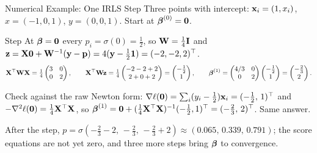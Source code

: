 \documentclass[11pt,aspectratio=169]{beamer}
\begin{document}
\begin{frame}{Numerical Example: One IRLS Step}\footnotesize
Three points with intercept: $\mathbf{x}_i=(1,x_i)$, $x=(-1,0,1)$, $y=(0,0,1)$. Start at $\boldsymbol{\beta}^{(0)}=\mathbf{0}$.
\begin{derivation}{Step}
At $\boldsymbol{\beta}=\mathbf{0}$ every $p_i=\sigma(0)=\tfrac12$, so $\mathbf{W}=\tfrac14\mathbf{I}$ and
$\mathbf{z}=\mathbf{X}\mathbf{0}+\mathbf{W}^{-1}(\mathbf{y}-\mathbf{p})=4(\mathbf{y}-\tfrac12\mathbf{1})=(-2,-2,2)^{\top}$.
\[
\mathbf{X}^{\top}\mathbf{W}\mathbf{X}=\tfrac14\begin{pmatrix}3&0\\0&2\end{pmatrix},\qquad
\mathbf{X}^{\top}\mathbf{W}\mathbf{z}=\tfrac14\begin{pmatrix}-2-2+2\\ 2+0+2\end{pmatrix}=\begin{pmatrix}-\tfrac12\\1\end{pmatrix},\qquad
\boldsymbol{\beta}^{(1)}=\begin{pmatrix}4/3&0\\0&2\end{pmatrix}\begin{pmatrix}-\tfrac12\\1\end{pmatrix}=\begin{pmatrix}-\tfrac23\\2\end{pmatrix}.
\]
\end{derivation}
Check against the raw Newton form: $\nabla\ell(\mathbf{0})=\sum_i(y_i-\tfrac12)\mathbf{x}_i=(-\tfrac12,\,1)^{\top}$ and
$-\nabla^2\ell(\mathbf{0})=\tfrac14\mathbf{X}^{\top}\mathbf{X}$, so $\boldsymbol{\beta}^{(1)}=\mathbf{0}+(\tfrac14\mathbf{X}^{\top}\mathbf{X})^{-1}(-\tfrac12,1)^{\top}=(-\tfrac23,\,2)^{\top}$. Same answer.
\vspace{4pt}

After the step, $p=\sigma(-\tfrac23-2,\,-\tfrac23,\,-\tfrac23+2)\approx(0.065,\,0.339,\,0.791)$; the score equations are not yet zero,
and three more steps bring $\boldsymbol{\beta}$ to convergence.
\end{frame}
\end{document}
